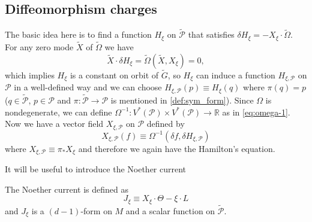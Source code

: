 \documentclass[10pt]{article}
\begin{document}
\subsection{Diffeomorphism charges}
\begin{intu}
    The basic idea here is to find a function $H_\xi$ on $\widetilde{\mathcal{P}}$ that satisfies $\delta H_\xi=-X_\xi\cdot\widetilde{\Omega}$.
    For any zero mode $\widetilde{X}$ of $\widetilde{\Omega}$ we have 
    \begin{equation}
        \widetilde{X}\cdot\delta H_\xi=\widetilde{\Omega}\left(\widetilde{X},X_\xi\right)=0,
    \end{equation}
    which implies $H_\xi$ is a constant on orbit of $\widetilde{G}$, so $H_\xi$ can induce a function $H_{\xi,\mathcal{P}}$ on $\mathcal{P}$ in a well-defined way and we can choose $H_{\xi,\mathcal{P}}(p)\equiv H_{\xi}(q)$ where $\pi(q)=p$ ($q\in\widetilde{\mathcal{P}}$, $p\in\mathcal{P}$ and $\pi:\widetilde{\mathcal{P}}\to\mathcal{P}$ is mentioned in \cref{def:sym_form}).
    Since $\Omega$ is nondegenerate, we can define $\Omega^{-1}:V^\ast(\mathcal{P})\times V^\ast(\mathcal{P})\to \mathbb{R}$ as in \cref{eq:omega-1}.
    Now we have a vector field $X_{\xi,\mathcal{P}}$ on $\mathcal{P}$ defined by
    \begin{equation}
        X_{\xi,\mathcal{P}}(f)\equiv\Omega^{-1}\left(\delta f,\delta H_{\xi,\mathcal{P}}\right)
    \end{equation}
    where $X_{\xi,\mathcal{P}}\equiv \pi_\ast X_{\xi}$ and therefore we again have the Hamilton's equation.
\end{intu}

It will be useful to introduce the Noether current\cite{Iyer:1994ys}
\begin{definition}
    The Noether current is defined as
    \begin{equation}
        J_\xi\equiv X_\xi\cdot\Theta-\xi\cdot L
    \end{equation}
    and $J_\xi$ is a $(d-1)$-form on $M$ and a scalar function on $\widetilde{\mathcal{P}}$.
\end{definition}
\end{document}
